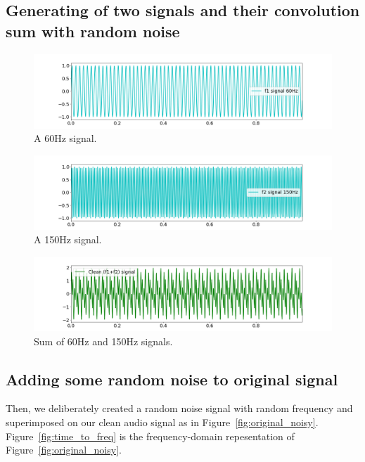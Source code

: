 \documentclass[a4paper, 12pt]{scrartcl}
\begin{document}
\subsection{Generating of two signals and their convolution sum with random noise}
\begin{figure}[H] 
  \centering
  \includegraphics[width=\textwidth]{img/signal_60hz.png}
  \caption{A 60Hz signal.}
  \label{fig:sixty}
\end{figure}


\begin{figure}[H] 
  \centering
  \includegraphics[width=\textwidth]{img/signal_150hz.png}
  \caption{A 150Hz signal.}
  \label{fig:onefifty}
\end{figure}

\begin{figure}[H] 
  \centering
  \includegraphics[width=\textwidth]{img/sum_signals.png}
  \caption{Sum of 60Hz and 150Hz signals.}
  \label{fig:sumsignals}
\end{figure}
\subsection{Adding some random noise to original signal}

Then, we deliberately created a random noise signal with random frequency and superimposed on our clean audio signal as in Figure~\ref{fig:original_noisy}. 
Figure~\ref{fig:time_to_freq} is the frequency-domain repesentation of Figure~\ref{fig:original_noisy}.
\end{document}

